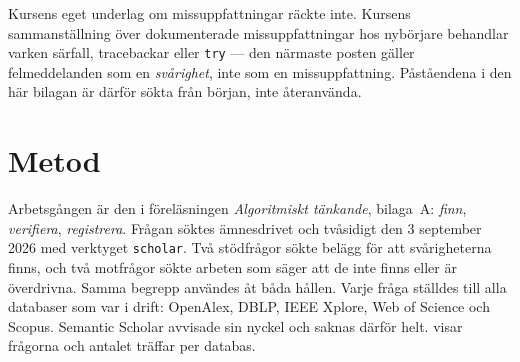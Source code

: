 Kursens eget underlag om missuppfattningar räckte inte.  Kursens
sammanställning över dokumenterade
missuppfattningar hos nybörjare \autocite{SooriBosk2026} behandlar
varken särfall, tracebackar eller \texttt{try} --- den
närmaste posten gäller
felmeddelanden som en \emph{svårighet}, inte som en missuppfattning.
Påståendena i den här bilagan är därför sökta från början, inte
återanvända.

\section{Metod}
\label{sec:nyb-metod}

Arbetsgången är den i föreläsningen \emph{Algoritmiskt tänkande},
bilaga~A: \emph{finn}, \emph{verifiera},
\emph{registrera}.  Frågan söktes ämnesdrivet och tvåsidigt den 3
september 2026 med verktyget \texttt{scholar}.  Två stödfrågor sökte
belägg för att svårigheterna finns, och två motfrågor sökte arbeten som
säger att de inte finns eller är överdrivna.  Samma begrepp användes åt
båda hållen.  Varje fråga ställdes till alla databaser som var i drift:
OpenAlex, DBLP, IEEE Xplore, Web of Science och Scopus.  Semantic
Scholar avvisade sin nyckel och saknas därför helt.
 visar frågorna och antalet träffar per databas.


